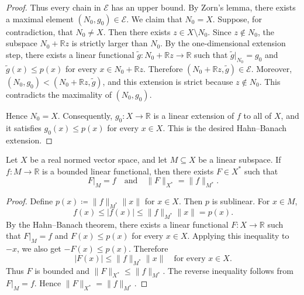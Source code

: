 \begin{proof}
    Thus every chain in \(\mathcal{E}\) has an upper bound. By Zorn's lemma, there exists a maximal element \((N_0, g_0) \in \mathcal{E}\). We claim that \(N_0 = X\). Suppose, for contradiction, that \(N_0 \neq X\). Then there exists \(z \in X \setminus N_0\). Since \(z \notin N_0\), the subspace \(N_0 + \mathbb{R} z\) is strictly larger than \(N_0\). By the one-dimensional extension step, there exists a linear functional \(\widetilde{g} : N_0 + \mathbb{R} z \to \mathbb{R}\) such that \(\widetilde{g}\vert_{N_0} = g_0\) and \(\widetilde{g}(x) \leq p(x)\) for every \(x \in N_0 + \mathbb{R} z\). Therefore \((N_0 + \mathbb{R} z, \widetilde{g}) \in \mathcal{E}\). Moreover, \((N_0, g_0) < (N_0 + \mathbb{R} z, \widetilde{g})\), and this extension is strict because \(z \notin N_0\). This contradicts the maximality of \((N_0, g_0)\).

    Hence \(N_0 = X\). Consequently, \(g_0 : X \to \mathbb{R}\) is a linear extension of \(f\) to all of \(X\), and it satisfies \(g_0(x) \leq p(x)\) for every \(x \in X\). This is the desired Hahn--Banach extension.
\end{proof}

\begin{theorem} \label{thm: hahn-banach extension}
    Let \(X\) be a real normed vector space, and let \(M \subseteq X\) be a linear subspace. If \(f : M \to \mathbb{R}\) is a bounded linear functional, then there exists \(F \in X^*\) such that
    \[
        F\vert_M = f \quad \text{and} \quad \lVert F \rVert_{X^*} = \lVert f \rVert_{M^*}.
    \]
\end{theorem}

\begin{proof}
    Define \(p(x) \coloneqq \lVert f \rVert_{M^*} \lVert x \rVert\) for \(x \in X\). Then \(p\) is sublinear. For \(x \in M\),
    \[
        f(x) \leq \vert f(x) \vert \leq \lVert f \rVert_{M^*} \lVert x \rVert = p(x).
    \]
    By the Hahn--Banach theorem, there exists a linear functional \(F : X \to \mathbb{R}\) such that \(F\vert_M = f\) and \(F(x) \leq p(x)\) for every \(x \in X\). Applying this inequality to \(-x\), we also get \(-F(x) \leq p(x)\). Therefore
    \[
        \vert F(x) \vert \leq \lVert f \rVert_{M^*} \lVert x \rVert \quad \text{for every } x \in X.
    \]
    Thus \(F\) is bounded and \(\lVert F \rVert_{X^*} \leq \lVert f \rVert_{M^*}\). The reverse inequality follows from \(F\vert_M = f\). Hence \(\lVert F \rVert_{X^*} = \lVert f \rVert_{M^*}\).
\end{proof}

